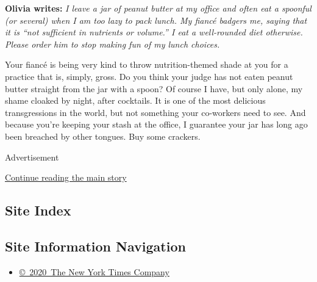 \textbf{Olivia writes:} \emph{I leave a jar of peanut butter at my
office and often eat a spoonful (or several) when I am too lazy to pack
lunch. My fiancé badgers me, saying that it is ``not sufficient in
nutrients or volume.'' I eat a well-rounded diet otherwise. Please order
him to stop making fun of my lunch choices.}

Your fiancé is being very kind to throw nutrition-themed shade at you
for a practice that is, simply, gross. Do you think your judge has not
eaten peanut butter straight from the jar with a spoon? Of course I
have, but only alone, my shame cloaked by night, after cocktails. It is
one of the most delicious transgressions in the world, but not something
your co-workers need to see. And because you're keeping your stash at
the office, I guarantee your jar has long ago been breached by other
tongues. Buy some crackers.

Advertisement

\protect\hyperlink{after-bottom}{Continue reading the main story}

\hypertarget{site-index}{%
\subsection{Site Index}\label{site-index}}

\hypertarget{site-information-navigation}{%
\subsection{Site Information
Navigation}\label{site-information-navigation}}

\begin{itemize}
\tightlist
\item
  \href{https://help.nytimes3xbfgragh.onion/hc/en-us/articles/115014792127-Copyright-notice}{©~2020~The
  New York Times Company}
\end{itemize}

